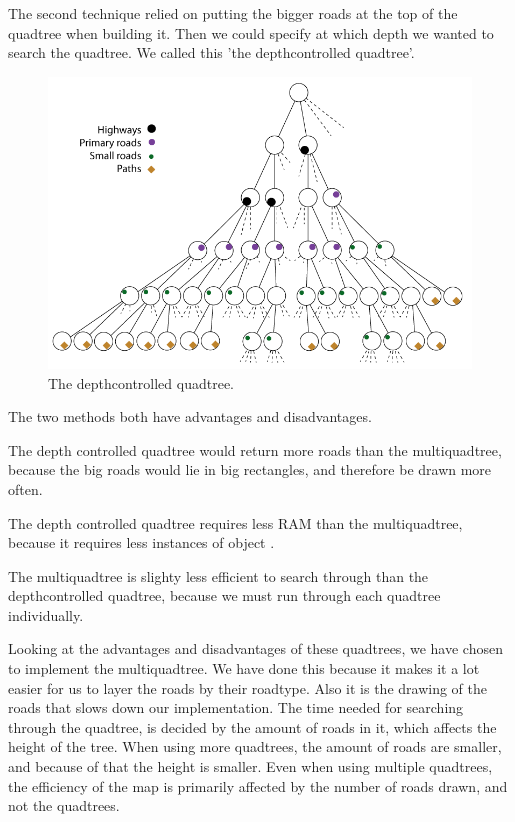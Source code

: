The second technique relied on putting the bigger roads at the top of the
quadtree when building it. Then we could specify at which depth we wanted to
search the quadtree. We called this 'the depthcontrolled quadtree'.

\begin{figure}[h!]
\centering
\includegraphics[width=1\linewidth]{images/DepthcontrolledQuadtree.png}
\caption{The depthcontrolled quadtree.}
\label{IMPL-DCQ}
\end{figure}

The two methods both have advantages and disadvantages.

The depth controlled quadtree would return more roads than the multiquadtree,
because the big roads would lie in big rectangles, and therefore be drawn more
often.

The depth controlled quadtree requires less RAM than the multiquadtree,
because it requires less instances of object .

The multiquadtree is slighty less efficient to search through than the
depthcontrolled quadtree, because we must run through each quadtree
individually.

Looking at the advantages and disadvantages of these quadtrees, we have chosen
to implement the multiquadtree. We have done this because it makes it a lot easier for 
us to layer the roads by their roadtype. Also it is the drawing of the roads that slows 
down our implementation. The time needed for searching through the quadtree, is 
decided by the amount of roads in it, which affects the height of the tree. When using 
more quadtrees, the amount of roads are smaller, and because of that the height is 
smaller. Even when using multiple quadtrees, the efficiency of the map is primarily 
affected by the number of roads drawn, and not the quadtrees.

